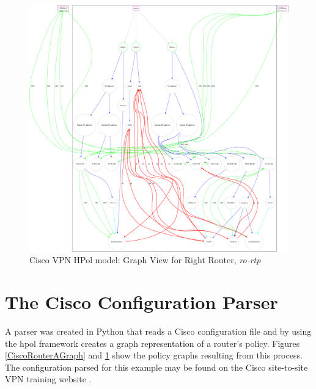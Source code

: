 \documentclass[12pt,letterpaper]{report}
\begin{document}
\begin{figure}
\centering


\includegraphics[angle=90, height=.9\textheight, width=\textwidth]{s2svpnB.pdf}

\caption{Cisco VPN HPol model: Graph View for Right Router, \textit{ro-rtp}}%
\label{CiscoRouterBGraph}%
\end{figure}%


\section{The Cisco Configuration Parser}

{A parser was created in Python that reads a Cisco configuration file and by using the \ac{hpol} framework creates a graph representation of a router's policy. Figures \ref{CiscoRouterAGraph} and \ref{CiscoRouterBGraph} show the policy graphs resulting from this process. The configuration parsed for this example may be found on the Cisco site-to-site VPN training website {\cite{CiscoVPNExampleWebLink}}.}
\end{document}
